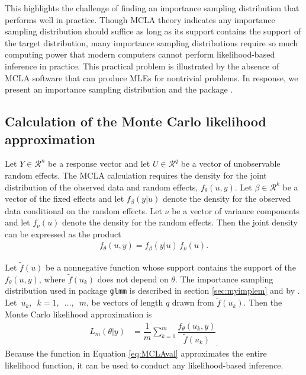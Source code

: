 \documentclass[article]{jss}
\begin{document}
This highlights the challenge of  finding an importance sampling distribution that performs well in practice. Though MCLA theory indicates any importance sampling distribution should suffice as long as its support contains the support of the target distribution, many importance sampling distributions require so much computing power that modern computers cannot perform  likelihood-based inference in practice.
  This practical problem is  illustrated by the absence of MCLA software that can produce MLEs for nontrivial problems. In response, we present an importance sampling distribution \citep{mythesis} and the  package .\\

\subsection{Calculation of the Monte Carlo likelihood approximation}

Let $Y \in \mathcal{R}^n$ be a response vector and let $U \in \mathcal{R}^q$ be a vector of unobservable random effects. The MCLA calculation requires the density for the joint distribution of the observed data  and random effects, $f_\theta(u,y)$. Let  $\beta \in \mathcal{R}^k$ be a vector of the fixed effects and let $f_\beta(y|u)$ denote the density for the observed data conditional on the random effects. Let $\nu$ be a vector of variance components and let $f_\nu (u)$ denote the density for the random effects. Then the joint density can be expressed as the product 
\begin{align}
f_\theta (u,y) = f_\beta(y|u) \, f_\nu (u).
\end{align}


Let $\tilde{f}(u)$ be a nonnegative function whose support contains the support of the $f_\theta(u,y)$, where $\tilde{f}(u_k)$ does not depend on $\theta$.  The  importance sampling distribution used in  package \texttt{glmm} is described in section \ref{sec:myimplem} and by \citet{mythesis}.  Let\hbox{ $u_k,$ $k=1,$ $\ldots,$ $m$}, be vectors of length $q$ drawn from  $\tilde{f}(u_k)$.  
Then the Monte Carlo  likelihood approximation is
\begin{align}
L_{m}(\theta|y) &=   \dfrac{1}{m} \sum_{k=1}^m  \dfrac{ f_\theta(u_k,y)   }{\tilde{f}(u_k)}_. \label{eq:MCLAval}
\end{align}
Because the function in Equation \ref{eq:MCLAval} approximates the entire likelihood function, it can be used to conduct any likelihood-based inference.\\
\end{document}
